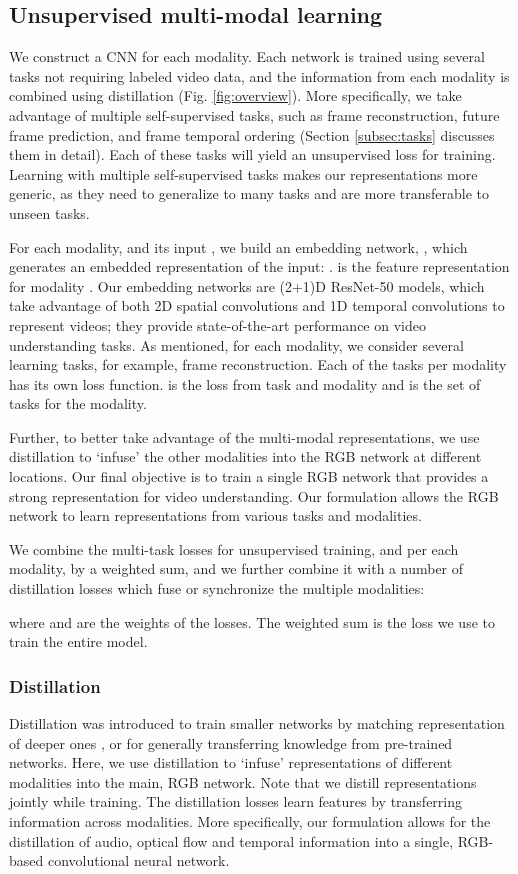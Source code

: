 \documentclass[10pt,twocolumn,letterpaper]{article}
\begin{document}
\subsection{Unsupervised multi-modal learning}
\label{sec:multi}

We construct a CNN for each modality. Each network is trained using several tasks not requiring labeled video data, and the information from each modality is combined using distillation \cite{hinton2015distilling} (Fig. \ref{fig:overview}). More specifically, we take advantage of multiple self-supervised tasks, such as frame reconstruction, future frame prediction, and frame temporal ordering (Section \ref{subsec:tasks} discusses them in detail). Each of these tasks will yield an unsupervised loss for training. Learning with multiple self-supervised tasks makes our representations more generic, as they need to generalize to many tasks and are more transferable to unseen tasks. 


For each modality,  and its input , we build an embedding network, , which generates an embedded representation of the input: .  is the feature representation for modality . Our embedding networks are (2+1)D ResNet-50 models, which take advantage of both 2D spatial convolutions and 1D temporal convolutions to represent videos; they provide state-of-the-art performance on video understanding tasks. As mentioned, for each modality, we consider several learning tasks, for example, frame reconstruction. Each of the tasks per modality has its own loss function.  is the loss from task  and modality  and  is the set of tasks for the modality.

Further, to better take advantage of the multi-modal representations, we use distillation to `infuse' the other modalities into the RGB network at different locations. Our final objective is to train a single RGB network that provides a strong representation for video understanding. Our formulation allows the RGB network to learn representations from various tasks and modalities.

We combine the multi-task losses for unsupervised training, and per each modality, by a weighted sum, and we further combine it with a number of distillation losses  which fuse or synchronize the multiple modalities:

where  and  are the weights of the losses. The weighted sum  is the loss we use to train the entire model.



\subsubsection{Distillation}
Distillation was introduced to train smaller networks by matching representation of deeper ones \cite{hinton2015distilling}, or for generally transferring knowledge from pre-trained networks. Here, we use distillation to `infuse' representations of different modalities into the main, RGB network. Note that we distill representations jointly while training. The distillation losses learn features by transferring information across modalities. More specifically, our formulation allows for the distillation of audio, optical flow and temporal information into a single, RGB-based convolutional neural network. 
\end{document}
